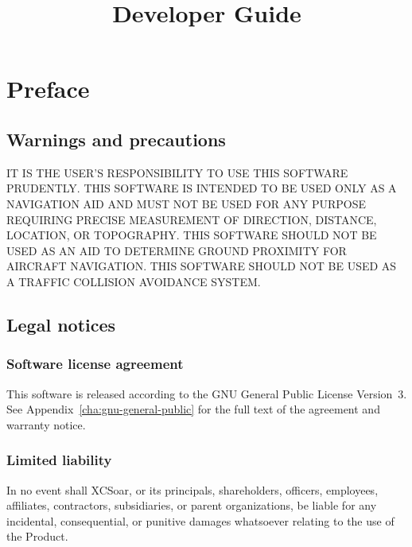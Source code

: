 \documentclass[german,a4paper,11pt]{refrep}
\title{Developer Guide}%
\begin{document}
\sloppy

\maketitle

 
\begingroup
\setlength{\parskip}{0.1\baselineskip}
\tableofcontents
\endgroup


\chapter*{Preface}

\section*{Warnings and precautions}

\warning IT IS THE USER'S RESPONSIBILITY TO USE THIS SOFT\-WARE PRUDENTLY. THIS SOFTWARE IS 
INTENDED TO BE USED ONLY AS A NAVIGATION AID AND MUST NOT BE USED FOR ANY PURPOSE REQUIRING 
PRECISE MEASURE\-MENT OF DIRECTION, DISTANCE, LOCATION, OR TOPO\-GRAPHY. THIS SOFTWARE SHOULD 
NOT BE USED AS AN AID TO DETERMINE GROUND PROXIMITY FOR AIRCRAFT NAVIGATION. THIS SOFTWARE 
SHOULD NOT BE USED AS A TRAFFIC COLLISION AVOIDANCE SYSTEM.



\section*{Legal notices}

\subsection*{Software license agreement}

This software is released according to the GNU General Public License
Version~3.  See Appendix~\ref{cha:gnu-general-public} for the full
text of the agreement and warranty notice.

\subsection*{Limited liability}

In no event shall XCSoar, or its principals, shareholders, officers,
employees, affiliates, contractors, subsidiaries, or parent
organizations, be liable for any incidental, consequential, or
punitive damages whatsoever relating to the use of the Product.
\end{document}
